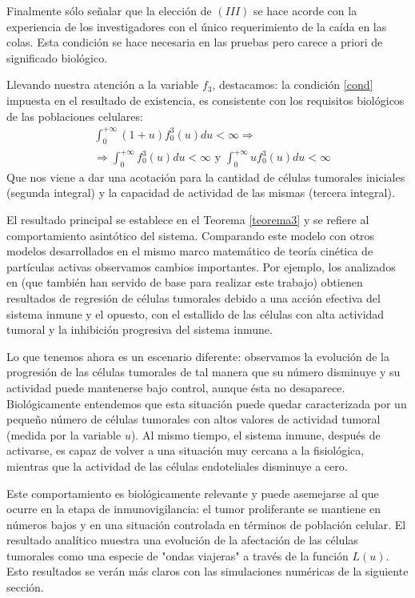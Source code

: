 \documentclass[1p]{elsarticle}
\begin{document}
 Finalmente sólo señalar que la elección de $(III)$ se hace acorde con la experiencia de los investigadores con el único requerimiento de la caída en las colas. Esta condición se hace necesaria en las pruebas pero carece a priori de significado biológico.
  
Llevando nuestra atención a la variable $f_3$, destacamos: la condición \ref{cond} impuesta en el resultado de existencia,  es consistente con los requisitos biológicos de las poblaciones celulares:
\begin{equation}
\begin{split}
&\int_{0}^{+\infty}(1+u)f_0^3(u)du<\infty\Rightarrow\\
&\Rightarrow\int_{0}^{+\infty}f_0^3(u)du<\infty \text{ y }\int_{0}^{+\infty}uf_0^3(u)du<\infty
\end{split} 
\end{equation}
Que nos viene a dar una acotación para la cantidad de células tumorales iniciales (segunda integral) y la capacidad de actividad de las mismas (tercera integral).

El resultado principal se establece en el Teorema \ref{teorema3} y se refiere al comportamiento asintótico del sistema. Comparando este modelo con otros modelos desarrollados en el mismo marco matemático de teoría cinética de partículas activas observamos cambios importantes. Por ejemplo, los analizados en \cite{textolargo,existencia} (que también han servido de base para realizar este trabajo) obtienen resultados de regresión de células tumorales debido a una acción efectiva del sistema inmune y el opuesto, con el estallido de las células con alta actividad tumoral y la inhibición progresiva del sistema inmune. 

Lo que tenemos ahora es un escenario diferente: observamos la evolución de la progresión de las células tumorales de tal manera que su número disminuye y su actividad puede mantenerse bajo control, aunque ésta no desaparece. Biológicamente entendemos que esta situación puede quedar caracterizada por un pequeño número de células tumorales con altos valores de actividad tumoral (medida por la variable $u$). Al mismo tiempo, el sistema inmune, después de  activarse, es capaz de volver a una situación muy cercana a la fisiológica, mientras que la actividad de las células endoteliales
disminuye a cero.

Este comportamiento es biológicamente relevante y puede asemejarse al que ocurre en la etapa de inmunovigilancia: el tumor proliferante se mantiene en números bajos y en una situación controlada en términos de población celular. El resultado analítico muestra una evolución
de la afectación de las células tumorales como una especie de "ondas viajeras" a través de la función $L(u)$. Esto resultados se verán más claros con las simulaciones numéricas de la siguiente sección.
\end{document}
